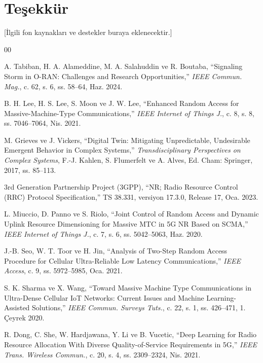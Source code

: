 \documentclass[conference]{IEEEtran}
\begin{document}
\section*{Teşekkür}

[İlgili fon kaynakları ve destekler buraya eklenecektir.]

\begin{thebibliography}{00}

A. Tabiban, H. A. Alameddine, M. A. Salahuddin ve R. Boutaba,
``Signaling Storm in O-RAN: Challenges and Research Opportunities,''
\emph{IEEE Commun. Mag.},
c. 62, s. 6, ss. 58--64, Haz. 2024.

B. H. Lee, H. S. Lee, S. Moon ve J. W. Lee,
``Enhanced Random Access for Massive-Machine-Type Communications,''
\emph{IEEE Internet of Things J.},
c. 8, s. 8, ss. 7046--7064, Nis. 2021.

M. Grieves ve J. Vickers,
``Digital Twin: Mitigating Unpredictable, Undesirable Emergent Behavior in
Complex Systems,''
\emph{Transdisciplinary Perspectives on Complex Systems},
F.-J. Kahlen, S. Flumerfelt ve A. Alves, Ed.
Cham: Springer, 2017, ss. 85--113.

3rd Generation Partnership Project (3GPP),
``NR; Radio Resource Control (RRC) Protocol Specification,''
TS 38.331, versiyon 17.3.0, Release 17, Oca. 2023.

L. Miuccio, D. Panno ve S. Riolo,
``Joint Control of Random Access and Dynamic Uplink Resource Dimensioning
for Massive MTC in 5G NR Based on SCMA,''
\emph{IEEE Internet of Things J.},
c. 7, s. 6, ss. 5042--5063, Haz. 2020.

J.-B. Seo, W. T. Toor ve H. Jin,
``Analysis of Two-Step Random Access Procedure for Cellular Ultra-Reliable Low Latency Communications,''
\emph{IEEE Access},
c. 9, ss. 5972--5985, Oca. 2021.

S. K. Sharma ve X. Wang,
``Toward Massive Machine Type Communications in Ultra-Dense Cellular IoT
Networks: Current Issues and Machine Learning-Assisted Solutions,''
\emph{IEEE Commun. Surveys Tuts.},
c. 22, s. 1, ss. 426--471, 1. Çeyrek 2020.

R. Dong, C. She, W. Hardjawana, Y. Li ve B. Vucetic,
``Deep Learning for Radio Resource Allocation With Diverse Quality-of-Service
Requirements in 5G,''
\emph{IEEE Trans. Wireless Commun.},
c. 20, s. 4, ss. 2309--2324, Nis. 2021.


\end{thebibliography}
\end{document}
